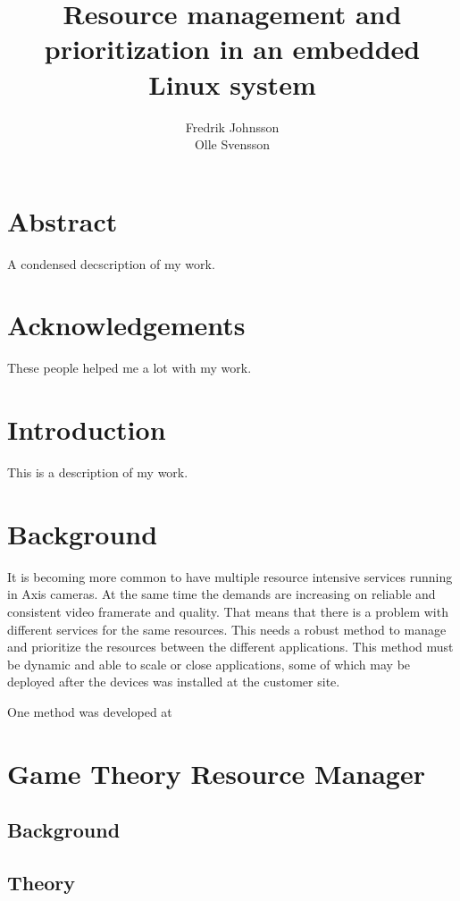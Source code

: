 \documentclass{LTHthesis}
\begin{document}
\begin{titlepages}
\author{Fredrik Johnsson\\Olle Svensson}
\title{Resource management and prioritization in an embedded Linux system}
\end{titlepages}
\setcounter{page}{1}
\chapter*{Abstract}
A condensed decscription of my work.
\chapter*{Acknowledgements}
These people helped me a lot with my work.
\newpage
\tableofcontents
\newpage
\setcounter{page}{1}
\chapter{Introduction}
This is a description of my work.
\chapter{Background}
It is becoming more common to have multiple resource intensive services running in Axis cameras. At the same time the demands are increasing on reliable and consistent video framerate and quality. That means that there is a problem with different services for the same resources. This needs a robust method to manage and prioritize the resources between the different applications. This method must be dynamic and able to scale or close applications, some of which may be deployed after the devices was installed at the customer site.

One method was developed at 
\chapter{Game Theory Resource Manager}
\section{Background} %
\section{Theory} %
\end{document}
